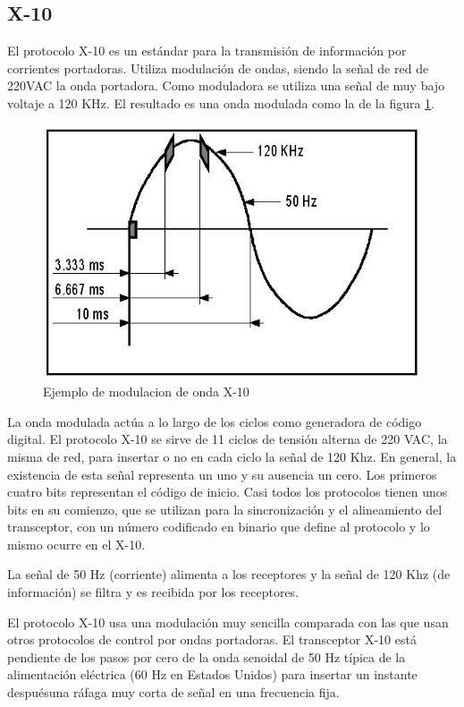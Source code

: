 \subsection{X-10}
El protocolo X-10 es un est\'andar para la transmisión de información por
corrientes portadoras. Utiliza modulación de ondas, siendo la señal de red de
220VAC la onda portadora. Como moduladora se utiliza una señal de muy bajo
voltaje a 120 KHz. El resultado es una onda modulada como la de la figura \ref{fig:modulacionx10}.

\begin{figure}[htbp]
	\centering
		\includegraphics{imagenes/image_x10.jpg}
	\caption{Ejemplo de modulacion de onda X-10}
	\label{fig:modulacionx10}
\end{figure}


La onda modulada actúa a lo largo de los ciclos como generadora de código
digital. El protocolo X-10 se sirve de 11 ciclos de tensión alterna de 220 VAC, la
misma de red, para insertar o no en cada ciclo la señal de 120 Khz. En general,
la existencia de esta señal representa un uno y su ausencia un cero. Los
primeros cuatro bits representan el código de inicio. Casi todos los protocolos
tienen unos bits en su comienzo, que se utilizan para la sincronización y el
alineamiento del transceptor, con un número codificado en binario que define al
protocolo y lo mismo ocurre en el X-10.


La señal de 50 Hz (corriente) alimenta a los receptores y la señal de 120
Khz (de información) se filtra y es recibida por los receptores.


El protocolo X-10 usa una modulación muy sencilla comparada con las
que usan otros protocolos de control por ondas portadoras. El transceptor X-10
est\'a pendiente de los pasos por cero de la onda senoidal de 50 Hz típica de la
alimentación eléctrica (60 Hz en Estados Unidos) para insertar un instante
despuésuna r\'afaga muy corta de señal en una frecuencia fija.


